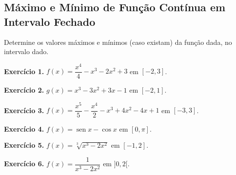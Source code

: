 \documentclass[12pt,a4paper]{article}
\begin{document}
\subsection{Máximo e Mínimo de Função Contínua em Intervalo Fechado}
\noindent Determine os valores máximos e mínimos (caso existam) da função dada, no intervalo dado.

\vspace{0.5cm}
\noindent\textbf{Exercício 1.} $f(x) = \dfrac{x^4}{4} - x^3 - 2x^2 + 3$ em $[-2, 3]$.

\vspace{0.5cm}
\noindent\textbf{Exercício 2.} $g(x) = x^3 - 3x^2 + 3x - 1$ em $[-2, 1]$.

\vspace{0.5cm}
\noindent\textbf{Exercício 3.} $f(x) = \dfrac{x^5}{5} - \dfrac{x^4}{2} - x^3 + 4x^2 - 4x + 1$ em $[-3, 3]$.

\vspace{0.5cm}
\noindent\textbf{Exercício 4.} $f(x) = \operatorname{sen} x - \cos x$ em $[0, \pi]$.

\vspace{0.5cm}
\noindent\textbf{Exercício 5.} $f(x) = \sqrt[3]{x^3 - 2x^2}$ em $[-1, 2]$.

\vspace{0.5cm}
\noindent\textbf{Exercício 6.} $f(x) = \dfrac{1}{x^3 - 2x^2}$ em ${]0, 2[}$.
\end{document}
